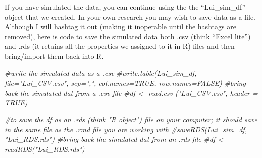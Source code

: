 \documentclass[
  english,
]{book}
\newenvironment{Shaded}{\begin{snugshade}}{\end{snugshade}}
\newcommand{\AttributeTok}[1]{\textcolor[rgb]{0.77,0.63,0.00}{#1}}
\newcommand{\CommentTok}[1]{\textcolor[rgb]{0.56,0.35,0.01}{\textit{#1}}}
\newcommand{\ConstantTok}[1]{\textcolor[rgb]{0.00,0.00,0.00}{#1}}
\newcommand{\DecValTok}[1]{\textcolor[rgb]{0.00,0.00,0.81}{#1}}
\newcommand{\FunctionTok}[1]{\textcolor[rgb]{0.00,0.00,0.00}{#1}}
\newcommand{\NormalTok}[1]{#1}
\newcommand{\OtherTok}[1]{\textcolor[rgb]{0.56,0.35,0.01}{#1}}
\newcommand{\SpecialCharTok}[1]{\textcolor[rgb]{0.00,0.00,0.00}{#1}}
\newcommand{\StringTok}[1]{\textcolor[rgb]{0.31,0.60,0.02}{#1}}
\begin{document}
\begin{Shaded}
\end{Shaded}

If you have simulated the data, you can continue using the the ``Lui\_sim\_df'' object that we created. In your own research you may wish to save data as a file. Although I will hashtag it out (making it inoperable until the hashtags are removed), here is code to save the simulated data both .csv (think ``Excel lite'') and .rds (it retains all the properties we assigned to it in R) files and then bring/import them back into R.

\begin{Shaded}
\begin{Highlighting}[]
\CommentTok{\#write the simulated data  as a .csv}
\CommentTok{\#write.table(Lui\_sim\_df, file="Lui\_CSV.csv", sep=",", col.names=TRUE, row.names=FALSE)}
\CommentTok{\#bring back the simulated dat from a .csv file}
\CommentTok{\#df \textless{}{-} read.csv ("Lui\_CSV.csv", header = TRUE)}
\end{Highlighting}
\end{Shaded}

\begin{Shaded}
\begin{Highlighting}[]
\CommentTok{\#to save the df as an .rds (think "R object") file on your computer; it should save in the same file as the .rmd file you are working with}
\CommentTok{\#saveRDS(Lui\_sim\_df, "Lui\_RDS.rds")}
\CommentTok{\#bring back the simulated dat from an .rds file}
\CommentTok{\#df \textless{}{-} readRDS("Lui\_RDS.rds")}
\end{Highlighting}
\end{Shaded}
\end{document}
